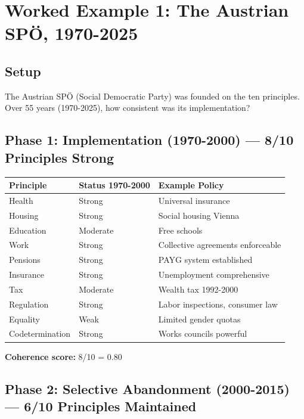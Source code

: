 \section{Worked Example 1: The Austrian SPÖ, 1970-2025}
\label{sec:bf-example1}

\subsection{Setup}

The Austrian SPÖ (Social Democratic Party) was founded on the ten principles. Over 55 years (1970-2025), how consistent was its implementation?

\subsection{Phase 1: Implementation (1970-2000) — 8/10 Principles Strong}

\begin{table}[h]
\centering
\small
\renewcommand{\arraystretch}{1.3}
\begin{tabular}{@{}lll@{}}
\toprule
\textbf{Principle} & \textbf{Status 1970-2000} & \textbf{Example Policy} \\
\midrule
Health & Strong & Universal insurance \\
Housing & Strong & Social housing Vienna \\
Education & Moderate & Free schools \\
Work & Strong & Collective agreements enforceable \\
Pensions & Strong & PAYG system established \\
Insurance & Strong & Unemployment comprehensive \\
Tax & Moderate & Wealth tax 1992-2000 \\
Regulation & Strong & Labor inspections, consumer law \\
Equality & Weak & Limited gender quotas \\
Codetermination & Strong & Works councils powerful \\
\bottomrule
\end{tabular}
\end{table}

\textbf{Coherence score:} 8/10 = 0.80

\subsection{Phase 2: Selective Abandonment (2000-2015) — 6/10 Principles Maintained}

